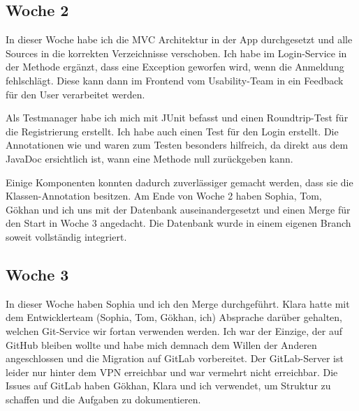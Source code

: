 \subsection{Woche 2}\label{subsec:woche2}
In dieser Woche habe ich die MVC Architektur in der App durchgesetzt und alle Sources
in die korrekten Verzeichnisse verschoben.
Ich habe im Login-Service in der Methode  ergänzt, dass eine Exception
geworfen wird, wenn die Anmeldung fehlschlägt.
Diese kann dann im Frontend vom Usability-Team in ein Feedback für den User verarbeitet werden.

Als Testmanager habe ich mich mit JUnit befasst und einen Roundtrip-Test für die Registrierung erstellt.
Ich habe auch einen Test für den Login erstellt.
Die Annotationen wie  und 
waren zum Testen besonders hilfreich, da direkt aus dem
JavaDoc ersichtlich ist, wann eine Methode null zurückgeben kann.

Einige Komponenten konnten dadurch zuverlässiger gemacht werden, dass sie die Klassen-Annotation
 besitzen.
Am Ende von Woche 2 haben Sophia, Tom, Gökhan und ich uns mit der Datenbank auseinandergesetzt und
einen Merge für den Start in Woche 3 angedacht.
Die Datenbank wurde in einem eigenen Branch soweit vollständig integriert.

\subsection{Woche 3}\label{subsec:woche3}
In dieser Woche haben Sophia und ich den Merge durchgeführt.
Klara hatte mit dem Entwicklerteam (Sophia, Tom, Gökhan, ich) Absprache darüber gehalten,
welchen Git-Service wir fortan verwenden werden.
Ich war der Einzige, der auf GitHub bleiben wollte und habe mich demnach dem Willen der Anderen
angeschlossen und die Migration auf GitLab vorbereitet.
Der GitLab-Server ist leider nur hinter dem VPN erreichbar und war vermehrt nicht erreichbar.
Die Issues auf GitLab haben Gökhan, Klara und ich verwendet, um Struktur zu schaffen und
die Aufgaben zu dokumentieren.

